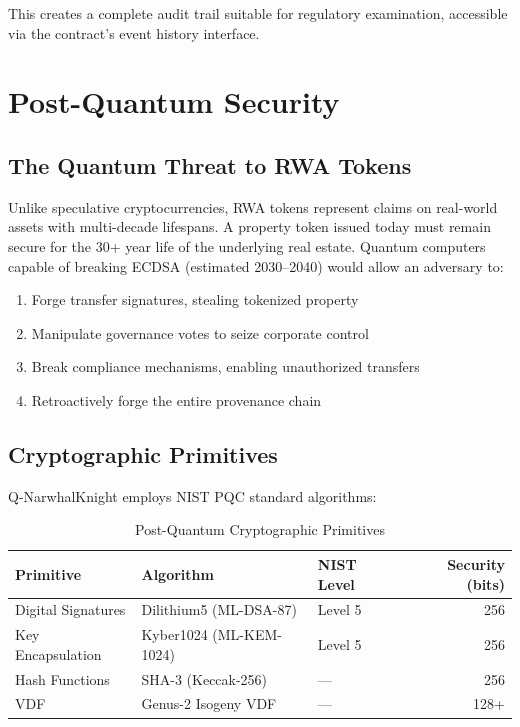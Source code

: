 \documentclass[11pt,a4paper,twoside]{article}
\begin{document}
This creates a complete audit trail suitable for regulatory examination, accessible via the contract's event history interface.

\section{Post-Quantum Security}
\label{sec:pq-security}

\subsection{The Quantum Threat to RWA Tokens}

\begin{securitybox}
Unlike speculative cryptocurrencies, RWA tokens represent claims on real-world assets with multi-decade lifespans. A property token issued today must remain secure for the 30+ year life of the underlying real estate. Quantum computers capable of breaking ECDSA (estimated 2030--2040) would allow an adversary to:
\begin{enumerate}
  \item Forge transfer signatures, stealing tokenized property
  \item Manipulate governance votes to seize corporate control
  \item Break compliance mechanisms, enabling unauthorized transfers
  \item Retroactively forge the entire provenance chain
\end{enumerate}
\end{securitybox}

\subsection{Cryptographic Primitives}

Q-NarwhalKnight employs NIST PQC standard algorithms:

\begin{table}[H]
\centering
\caption{Post-Quantum Cryptographic Primitives}
\label{tab:pq-primitives}
\begin{tabular}{@{}lllr@{}}
\toprule
\textbf{Primitive} & \textbf{Algorithm} & \textbf{NIST Level} & \textbf{Security (bits)} \\
\midrule
Digital Signatures & Dilithium5 (ML-DSA-87) & Level 5 & 256 \\
Key Encapsulation  & Kyber1024 (ML-KEM-1024) & Level 5 & 256 \\
Hash Functions     & SHA-3 (Keccak-256) & --- & 256 \\
VDF                & Genus-2 Isogeny VDF & --- & 128+ \\
\bottomrule
\end{tabular}
\end{table}
\end{document}
